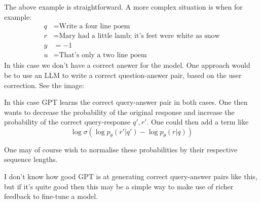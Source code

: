 The above example is straightforward. A more complex situation is when for example:
\begin{align}
    q & =\text{Write a four line poem}                               \\
    r & =\text{Mary had a little lamb; it's feet were white as snow} \\
    y & =-1                                                          \\
    u & =\text{That's only a two line poem}
\end{align}
In this case we don't have a correct answer for the model. One approach would be to use an LLM to write a correct question-answer pair, based on the user correction. See the image:
\begin{center}

\end{center}
In this case GPT learns the correct query-answer pair in both cases. One then wants to decrease the probability of the original response and increase the probability of the correct query-response $q',r'$. One could then add a term like
\begin{equation}
    \log \sigma\left(\log p_\theta(r'|q') - \log p_\theta(r|q) \right)
\end{equation}

One may of course wish to normalise these probabilities by their respective sequence lengths.

I don't know how good GPT is at generating correct query-answer pairs like this, but if it's quite good then this may be a simple way to make use of richer feedback to fine-tune a model.